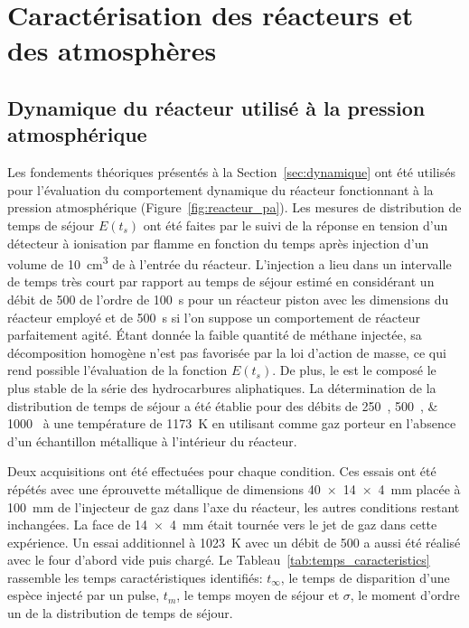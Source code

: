 \section{Caractérisation des réacteurs et des atmosphères}
\label{sec:caracterization_gaz}

\subsection{Dynamique du réacteur utilisé à la pression atmosphérique}
\label{sec:dynamique_experimentale}

Les fondements théoriques présentés à la Section~\ref{sec:dynamique} ont été utilisés pour l'évaluation du comportement dynamique du réacteur fonctionnant à la pression atmosphérique (Figure~\ref{fig:reacteur_pa}). Les mesures de distribution de temps de séjour $E(t_{s})$ ont été faites par le suivi de la réponse en tension d'un détecteur à ionisation par flamme en fonction du temps après injection d'un volume de \SI{10}{\cubic\centi\metre} de  à l'entrée du réacteur. L'injection a lieu dans un intervalle de temps très court par rapport au temps de séjour estimé \textendash{} en considérant un débit de \SI{500}{\sccm} \textendash{} de l'ordre de \SI{100}{\second} pour un réacteur piston avec les dimensions du réacteur employé et de \SI{500}{\second} si l'on suppose un comportement de réacteur parfaitement agité. Étant donnée la faible quantité de méthane injectée, sa décomposition homogène n'est pas favorisée par la loi d'action de masse, ce qui rend possible l'évaluation de la fonction $E(t_{s})$. De plus, le  est le composé le plus stable de la série des hydrocarbures aliphatiques. La détermination de la distribution de temps de séjour a été établie pour des débits de \SIlist{250;500;1000}{\sccm} à une température de \SI{1173}{\kelvin} en utilisant   comme gaz porteur en l'absence d'un échantillon métallique à l'intérieur du réacteur.

Deux acquisitions ont été effectuées pour chaque condition. Ces essais ont été répétés avec une éprouvette métallique de dimensions \SI{40 x 14 x 4}{\milli\metre} placée à \SI{100}{\milli\metre} de l'injecteur de gaz dans l'axe du réacteur, les autres conditions restant inchangées. La face de \SI{14 x 4}{\milli\metre} était tournée vers le jet de gaz dans cette expérience. Un essai additionnel à \SI{1023}{\kelvin} avec un débit de \SI{500}{\sccm} a aussi été réalisé avec le four d'abord vide puis chargé. Le Tableau~\ref{tab:temps_caracteristics} rassemble les temps caractéristiques identifiés: $t_{\infty}$, le temps de disparition d'une espèce injecté par un pulse, $t_{m}$, le temps moyen de séjour et $\sigma$, le moment d'ordre un de la distribution de temps de séjour.

